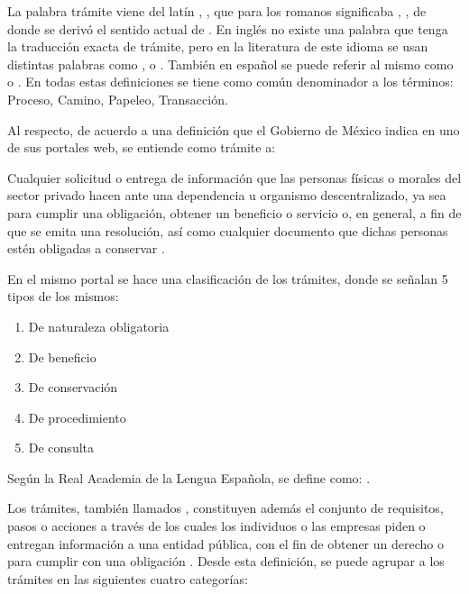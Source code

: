 La palabra trámite viene del latín , , que para los romanos significaba , , de donde se derivó el sentido actual de \cite{TramiteCastellanoPagina}. 
En inglés no existe una palabra que tenga la traducción exacta de trámite, pero en la literatura de este idioma se usan distintas palabras como ,  o . 
También en español se puede referir al mismo como  o . 
En todas estas definiciones se tiene como común denominador a los términos: Proceso, Camino, Papeleo, Transacción.

Al respecto, de acuerdo a una definición que el Gobierno de México indica en uno de sus portales web, se entiende como trámite a:

\begin{displayquote} 
    Cualquier solicitud o entrega de información que las personas físicas o morales del sector privado hacen ante una dependencia u organismo descentralizado, 
    ya sea para cumplir una obligación, obtener un beneficio o servicio o, en general, a fin de que se emita una resolución, así como cualquier documento que dichas personas estén obligadas a conservar \cite{epnQueEsTramite}.
\end{displayquote}

En el mismo portal se hace una clasificación de los trámites, donde se señalan 5 tipos de los mismos:

\begin{enumerate}
    \item De naturaleza obligatoria
    \item De beneficio
    \item De conservación
    \item De procedimiento
    \item De consulta
\end{enumerate}

Según la Real Academia de la Lengua Española, se define como: 
 \parencite{asaleDiccionarioLenguaEspanola}.

Los trámites, también llamados , constituyen además 
el conjunto de requisitos, pasos o acciones a través de los cuales los individuos o las empresas piden o entregan información a una entidad pública, con el fin de obtener un derecho o para cumplir con una obligación \cite[36]{rosethFinTramiteEterno2018}. 
Desde esta definición, se puede agrupar a los trámites en las siguientes cuatro categorías:

